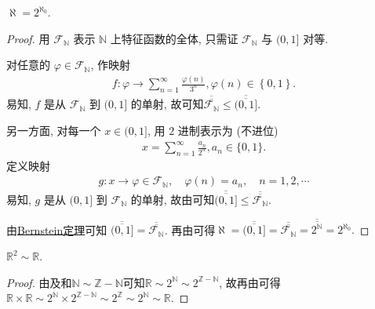\documentclass[../../main.tex]{subfiles}
\begin{document}
\begin{theorem}\label{theorem:aleph = 2^{aleph_0}}
$\aleph = 2^{\aleph_0}$.
\end{theorem}
\begin{proof}
用 $\mathcal{F}_{\mathbb{N}}$ 表示 $\mathbb{N}$ 上特征函数的全体, 只需证 $\mathcal{F}_{\mathbb{N}}$ 与 $(0, 1]$ 对等.

对任意的 $\varphi \in \mathcal{F}_{\mathbb{N}}$, 作映射
\begin{align*}
f:\varphi \rightarrow \sum_{n=1}^{\infty}{\frac{\varphi (n)}{3^n}},\varphi \left( n \right) \in \left\{ 0,1 \right\} .
\end{align*}
易知, $f$ 是从 $\mathcal{F}_{\mathbb{N}}$ 到 $(0, 1]$ 的单射, 故可知$\overline{\overline{\mathcal{F}_{\mathbb{N}}}} \leqslant \overline{\overline{(0, 1]}}$.

另一方面, 对每一个 $x \in (0, 1]$, 用 $2$ 进制表示为 (不进位)
\begin{align*}
x = \sum_{n = 1}^{\infty} \frac{a_n}{2^n}, a_n \in \{0, 1\}.
\end{align*}
定义映射
\begin{align*}
g : x \to \varphi \in \mathcal{F}_{\mathbb{N}}, \quad \varphi(n) = a_n, \quad n = 1, 2, \cdots
\end{align*}
易知, $g$ 是从 $(0, 1]$ 到 $\mathcal{F}_{\mathbb{N}}$ 的单射, 故由可知$\overline{\overline{(0, 1]}} \leqslant \overline{\overline{\mathcal{F}_{\mathbb{N}}}}$.

由\hyperref[theorem:Bernstein定理]{Bernstein定理}可知 $\overline{\overline{(0, 1]}} = \overline{\overline{\mathcal{F}_{\mathbb{N}}}}$. 再由可得$\aleph =\overline{\overline{(0,1]}}=\overline{\overline{\mathcal{F} _{\mathbb{N}}}}=\overline{\overline{2^{\mathbb{N}}}}=2^{\aleph _0}.$
\end{proof}

\begin{example}
$\mathbb{R}^2 \sim \mathbb{R}$.
\end{example}
\begin{proof}
由及和$\mathbb{N}\sim \mathbb{Z}-\mathbb{N}$可知$\mathbb{R} \sim 2^{\mathbb{N}} \sim 2^{\mathbb{Z} - \mathbb{N}}$, 故再由可得$\mathbb{R} \times \mathbb{R} \sim 2^{\mathbb{N}} \times 2^{\mathbb{Z} - \mathbb{N}} \sim 2^{\mathbb{Z}} \sim 2^{\mathbb{N}} \sim \mathbb{R}$.
\end{proof}
\end{document}
